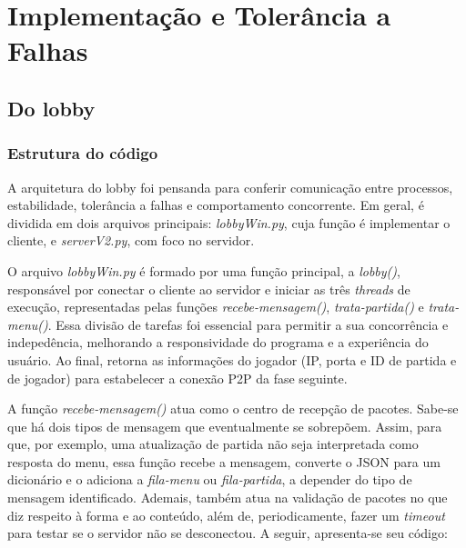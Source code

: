 \documentclass[11pt,a4paper]{article}
\begin{document}
\section{Implementação e Tolerância a Falhas}

\subsection{Do lobby}
\subsubsection{Estrutura do código}

A arquitetura do lobby foi pensanda para conferir comunicação entre processos, estabilidade, tolerância a falhas e comportamento concorrente. Em geral, é dividida em dois arquivos principais: \textit{lobbyWin.py}, cuja função é implementar o cliente, e \textit{serverV2.py}, com foco no servidor.

O arquivo \textit{lobbyWin.py} é formado por uma função principal, a \textit{lobby()}, responsável por conectar o cliente ao servidor e iniciar as três \textit{threads} de execução, representadas pelas funções \textit{recebe-mensagem()}, \textit{trata-partida()} e \textit{trata-menu()}. Essa divisão de tarefas foi essencial para permitir a sua concorrência e indepedência, melhorando a responsividade do programa e a experiência do usuário. Ao final, retorna as informações do jogador (IP, porta e ID de partida e de jogador) para estabelecer a conexão P2P da fase seguinte.

A função \textit{recebe-mensagem()} atua como o centro de recepção de pacotes. Sabe-se que há dois tipos de mensagem que eventualmente se sobrepõem. Assim, para que, por exemplo, uma atualização de partida não seja interpretada como resposta do menu, essa função recebe a mensagem, converte o JSON para um dicionário e o adiciona a \textit{fila-menu} ou \textit{fila-partida}, a depender do tipo de mensagem identificado. Ademais, também atua na validação de pacotes no que diz respeito à forma e ao conteúdo, além de, periodicamente, fazer um \textit{timeout} para testar se o servidor não se desconectou. A seguir, apresenta-se seu código:
\end{document}
